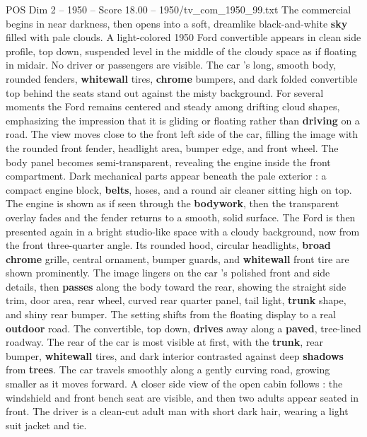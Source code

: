 \begin{textsample}{POS Dim 2 – 1950 – Score 18.00 – 1950/tv\_com\_1950\_99.txt}  \label{ex:f2_pos_083}
The commercial begins in near darkness, then opens into a soft, dreamlike black-and-white \textbf{sky} filled with pale clouds.
A light-colored 1950 Ford convertible appears in clean side profile, top down, suspended level in the middle of the cloudy space as if floating in midair.
No driver or passengers are visible.
The car ’s long, smooth body, rounded fenders, \textbf{whitewall} tires, \textbf{chrome} bumpers, and dark folded convertible top behind the seats stand out against the misty background.
For several moments the Ford remains centered and steady among drifting cloud shapes, emphasizing the impression that it is gliding or floating rather than \textbf{driving} on a road.
The view moves close to the front left side of the car, filling the image with the rounded front fender, headlight area, bumper edge, and front wheel.
The body panel becomes semi-transparent, revealing the engine inside the front compartment.
Dark mechanical parts appear beneath the pale exterior : a compact engine block, \textbf{belts}, hoses, and a round air cleaner sitting high on top.
The engine is shown as if seen through the \textbf{bodywork}, then the transparent overlay fades and the fender returns to a smooth, solid surface.
The Ford is then presented again in a bright studio-like space with a cloudy background, now from the front three-quarter angle.
Its rounded hood, circular headlights, \textbf{broad} \textbf{chrome} grille, central ornament, bumper guards, and \textbf{whitewall} front tire are shown prominently.
The image lingers on the car ’s polished front and side details, then \textbf{passes} along the body toward the rear, showing the straight side trim, door area, rear wheel, curved rear quarter panel, tail light, \textbf{trunk} shape, and shiny rear bumper.
The setting shifts from the floating display to a real \textbf{outdoor} road.
The convertible, top down, \textbf{drives} away along a \textbf{paved}, tree-lined roadway.
The rear of the car is most visible at first, with the \textbf{trunk}, rear bumper, \textbf{whitewall} tires, and dark interior contrasted against deep \textbf{shadows} from \textbf{trees}.
The car travels smoothly along a gently curving road, growing smaller as it moves forward.
A closer side view of the open cabin follows : the windshield and front bench seat are visible, and then two adults appear seated in front.
The driver is a clean-cut adult man with short dark hair, wearing a light suit jacket and tie.

\end{textsample}
